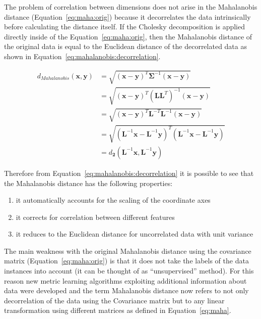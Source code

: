 \documentclass[12pt,a4paper]{report}
\begin{document}
The problem of correlation between dimensions does not arise in the Mahalanobis distance (Equation~\ref{eq:maha:orig}) because it decorrelates the data intrinsically before calculating the distance itself. If the Cholesky decomposition is applied directly inside of the Equation~\ref{eq:maha:orig}, then the Mahalanobis distance of the original data is equal to the Euclidean distance of the decorrelated data as shown in Equation~\ref{eq:mahalanobis:decorrelation}.

\begin{align}
  d_{Mahalanobis}(\textbf{x},\textbf{y}) &= \sqrt{(\textbf{x}-\textbf{y})^{T}\bm{\Sigma}^{-1}(\textbf{x}-\textbf{y})} \nonumber\\
         &= \sqrt{(\textbf{x}-\textbf{y})^{T}(\bm{L}\bm{L}^{T})^{-1}(\textbf{x}-\textbf{y})} \nonumber\\
         &= \sqrt{(\textbf{x}-\textbf{y})^{T}\bm{L}^{-T}\bm{L}^{-1}(\textbf{x}-\textbf{y})} \nonumber\\
         &= \sqrt{(\bm{L}^{-1}\textbf{x}-\bm{L}^{-1}\textbf{y})^{T}(\bm{L}^{-1}\textbf{x}-\bm{L}^{-1}\textbf{y})} \nonumber\\
         &= d_{\bm{2}}(\bm{L}^{-1}\textbf{x}, \bm{L}^{-1}\textbf{y}) \label{eq:mahalanobis:decorrelation}
\end{align}

Therefore from Equation~\ref{eq:mahalanobis:decorrelation} it is possible to see that the Mahalanobis distance has the following properties:
\begin{enumerate}
\item it automatically accounts for the scaling of the coordinate axes
\item it corrects for correlation between different features
\item it reduces to the Euclidean distance for uncorrelated data with unit variance
\end{enumerate}

The main weakness with the original Mahalanobis distance using the covariance matrix (Equation~\ref{eq:maha:orig}) is that it does not take the labels of the data instances into account (it can be thought of as ``unsupervised'' method). For this reason new metric learning algorithms exploiting additional information about data were developed and the term Mahalanobis distance now refers to not only decorrelation of the data using the Covariance matrix but to any linear transformation using different matrices as defined in Equation~\ref{eq:maha}.
\end{document}
